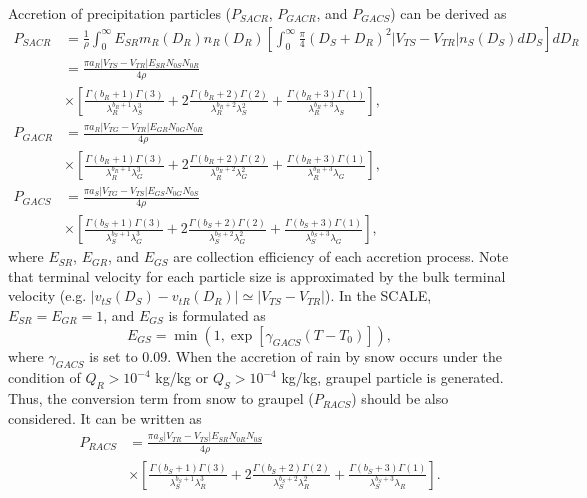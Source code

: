 Accretion of precipitation particles ($P_{SACR}$, $P_{GACR}$, and $P_{GACS}$) can be derived as
\begin{align}
  P_{SACR}&= \frac{1}{\rho}\int_{0}^{\infty}E_{SR}m_{R}(D_{R})n_{R}(D_{R})\left[\int_{0}^{\infty}\frac{\pi}{4}(D_{S}+D_{R})^{2}|V_{TS}-V_{TR}|n_{S}(D_{S})dD_{S}\right]dD_{R} \nonumber \\
  &=\frac{\pi a_{R}|V_{TS}-V_{TR}|E_{SR}N_{0S}N_{0R}}{4\rho} \nonumber \\
  &\times\left[\frac{\Gamma(b_{R}+1)\Gamma(3)}{\lambda^{b_{R}+1}_{R}\lambda^{3}_{S}}+2\frac{\Gamma(b_{R}+2)\Gamma(2)}{\lambda^{b_{R}+2}_{R}\lambda^{2}_{S}}+\frac{\Gamma(b_{R}+3)\Gamma(1)}{\lambda^{b_{R}+3}_{R}\lambda_{S}}\right], \\
  P_{GACR}&=\frac{\pi a_{R}|V_{TG}-V_{TR}|E_{GR}N_{0G}N_{0R}}{4\rho} \nonumber \\
  &\times\left[\frac{\Gamma(b_{R}+1)\Gamma(3)}{\lambda^{b_{R}+1}_{R}\lambda^{3}_{G}}+2\frac{\Gamma(b_{R}+2)\Gamma(2)}{\lambda^{b_{R}+2}_{R}\lambda^{2}_{G}}+\frac{\Gamma(b_{R}+3)\Gamma(1)}{\lambda^{b_{R}+3}_{R}\lambda_{G}}\right], \\
  P_{GACS}&=\frac{\pi a_{S}|V_{TG}-V_{TS}|E_{GS}N_{0G}N_{0S}}{4\rho} \nonumber \\
  &\times\left[\frac{\Gamma(b_{S}+1)\Gamma(3)}{\lambda^{b_{S}+1}_{S}\lambda^{3}_{G}}+2\frac{\Gamma(b_{S}+2)\Gamma(2)}{\lambda^{b_{S}+2}_{S}\lambda^{2}_{G}}+\frac{\Gamma(b_{S}+3)\Gamma(1)}{\lambda^{b_{S}+3}_{S}\lambda_{G}}\right],
\end{align}
where $E_{SR}$, $E_{GR}$, and $E_{GS}$ are collection efficiency of each accretion process. Note that terminal velocity for each particle size is approximated by the bulk terminal velocity (e.g. $|v_{tS}(D_{S})-v_{tR}(D_{R})| \simeq |V_{TS}-V_{TR}|$). In the SCALE, $E_{SR} = E_{GR} = 1$, and $E_{GS}$ is formulated as
\begin{equation}
  E_{GS}=\min(1,\exp[\gamma_{GACS}(T-T_{0})]),
\end{equation}
where $\gamma_{GACS}$ is set to 0.09.
When the accretion of rain by snow occurs under the condition of $Q_{R} > 10^{-4}$ kg/kg or $Q_{S} > 10^{-4}$ kg/kg, graupel particle is generated.
Thus, the conversion term from snow to graupel ($P_{RACS}$) should be also considered.
It can be written as
\begin{align}
  P_{RACS}&=\frac{\pi a_{S}|V_{TR}-V_{TS}|E_{SR}N_{0R}N_{0S}}{4\rho} \nonumber \\
  &\times\left[\frac{\Gamma(b_{S}+1)\Gamma(3)}{\lambda^{b_{S}+1}_{S}\lambda^{3}_{R}}+2\frac{\Gamma(b_{S}+2)\Gamma(2)}{\lambda^{b_{S}+2}_{S}\lambda^{2}_{R}}+\frac{\Gamma(b_{S}+3)\Gamma(1)}{\lambda^{b_{S}+3}_{S}\lambda_{R}}\right].
\end{align}

